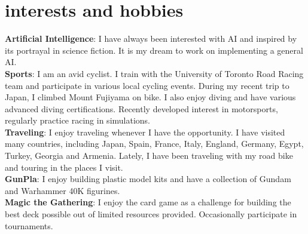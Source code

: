 \documentclass[]{cv-roald}
\begin{document}
\section*{interests and hobbies}
\textbf{Artificial Intelligence}: I have always been interested with AI and inspired by its portrayal in science fiction. It is my dream to work on implementing a general AI. \\
\textbf{Sports}: I am an avid cyclist. I train with the University of Toronto Road Racing team and participate in various local cycling events. During my recent trip to Japan, I climbed Mount Fujiyama on bike. 
I also enjoy diving and have various advanced diving certifications. Recently developed interest in motorsports, regularly practice racing in simulations.\\
\textbf{Traveling}: I enjoy traveling whenever I have the opportunity. I have visited many countries, including Japan, Spain, France, Italy, England, Germany, Egypt, Turkey, Georgia and Armenia. Lately, I have been traveling with my road bike and touring in the places I visit.\\
\textbf{GunPla}: I enjoy building plastic model kits and have a collection of Gundam and Warhammer 40K figurines.\\
\textbf{Magic the Gathering}: I enjoy the card game as a challenge for building the best deck possible out of limited resources provided. Occasionally participate in tournaments.\\
\end{document}
